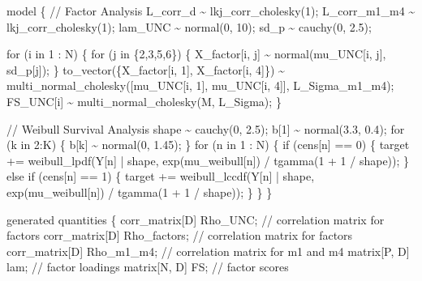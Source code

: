 \documentclass[
  letterpaper,
  DIV=11,
  numbers=noendperiod]{scrreprt}
\newenvironment{Shaded}{\begin{snugshade}}{\end{snugshade}}
\newcommand{\CommentTok}[1]{\textcolor[rgb]{0.37,0.37,0.37}{#1}}
\newcommand{\ControlFlowTok}[1]{\textcolor[rgb]{0.00,0.23,0.31}{#1}}
\newcommand{\DataTypeTok}[1]{\textcolor[rgb]{0.68,0.00,0.00}{#1}}
\newcommand{\DecValTok}[1]{\textcolor[rgb]{0.68,0.00,0.00}{#1}}
\newcommand{\FloatTok}[1]{\textcolor[rgb]{0.68,0.00,0.00}{#1}}
\newcommand{\KeywordTok}[1]{\textcolor[rgb]{0.00,0.23,0.31}{#1}}
\newcommand{\NormalTok}[1]{\textcolor[rgb]{0.00,0.23,0.31}{#1}}
\begin{document}
\begin{Shaded}
\begin{Highlighting}[]
\KeywordTok{model}\NormalTok{ \{}
  \CommentTok{// Factor Analysis}
\NormalTok{  L\_corr\_d \textasciitilde{} lkj\_corr\_cholesky(}\DecValTok{1}\NormalTok{);}
\NormalTok{  L\_corr\_m1\_m4 \textasciitilde{} lkj\_corr\_cholesky(}\DecValTok{1}\NormalTok{);}
\NormalTok{  lam\_UNC \textasciitilde{} normal(}\DecValTok{0}\NormalTok{, }\DecValTok{10}\NormalTok{);}
\NormalTok{  sd\_p \textasciitilde{} cauchy(}\DecValTok{0}\NormalTok{, }\FloatTok{2.5}\NormalTok{);}
  
  \ControlFlowTok{for}\NormalTok{ (i }\ControlFlowTok{in} \DecValTok{1}\NormalTok{ : N) \{}
    \ControlFlowTok{for}\NormalTok{ (j }\ControlFlowTok{in}\NormalTok{ \{}\DecValTok{2}\NormalTok{,}\DecValTok{3}\NormalTok{,}\DecValTok{5}\NormalTok{,}\DecValTok{6}\NormalTok{\}) \{}
\NormalTok{      X\_factor[i, j] \textasciitilde{} normal(mu\_UNC[i, j], sd\_p[j]);}
\NormalTok{    \}}
\NormalTok{    to\_vector(\{X\_factor[i, }\DecValTok{1}\NormalTok{], X\_factor[i, }\DecValTok{4}\NormalTok{]\}) \textasciitilde{} multi\_normal\_cholesky([mu\_UNC[i, }\DecValTok{1}\NormalTok{], mu\_UNC[i, }\DecValTok{4}\NormalTok{]]\textquotesingle{}, L\_Sigma\_m1\_m4);}
\NormalTok{    FS\_UNC[i] \textasciitilde{} multi\_normal\_cholesky(M, L\_Sigma);}
\NormalTok{  \}}

  \CommentTok{// Weibull Survival Analysis}
\NormalTok{  shape \textasciitilde{} cauchy(}\DecValTok{0}\NormalTok{, }\FloatTok{2.5}\NormalTok{);}
\NormalTok{  b[}\DecValTok{1}\NormalTok{] \textasciitilde{} normal(}\FloatTok{3.3}\NormalTok{, }\FloatTok{0.4}\NormalTok{);}
  \ControlFlowTok{for}\NormalTok{ (k }\ControlFlowTok{in} \DecValTok{2}\NormalTok{:K) \{}
\NormalTok{    b[k] \textasciitilde{} normal(}\DecValTok{0}\NormalTok{, }\FloatTok{1.45}\NormalTok{);}
\NormalTok{  \}}
  \ControlFlowTok{for}\NormalTok{ (n }\ControlFlowTok{in} \DecValTok{1}\NormalTok{ : N) \{}
    \ControlFlowTok{if}\NormalTok{ (cens[n] == }\DecValTok{0}\NormalTok{) \{}
      \KeywordTok{target +=}\NormalTok{ weibull\_lpdf(Y[n] | shape, exp(mu\_weibull[n]) / tgamma(}\DecValTok{1}\NormalTok{ + }\DecValTok{1}\NormalTok{ / shape));}
\NormalTok{    \} }\ControlFlowTok{else} \ControlFlowTok{if}\NormalTok{ (cens[n] == }\DecValTok{1}\NormalTok{) \{}
      \KeywordTok{target +=}\NormalTok{ weibull\_lccdf(Y[n] | shape, exp(mu\_weibull[n]) / tgamma(}\DecValTok{1}\NormalTok{ + }\DecValTok{1}\NormalTok{ / shape));}
\NormalTok{    \} }
\NormalTok{  \}}
\NormalTok{\}}

\KeywordTok{generated quantities}\NormalTok{ \{}
  \DataTypeTok{corr\_matrix}\NormalTok{[D] Rho\_UNC; }\CommentTok{// correlation matrix for factors}
  \DataTypeTok{corr\_matrix}\NormalTok{[D] Rho\_factors; }\CommentTok{// correlation matrix for factors}
  \DataTypeTok{corr\_matrix}\NormalTok{[D] Rho\_m1\_m4; }\CommentTok{// correlation matrix for m1 and m4}
  \DataTypeTok{matrix}\NormalTok{[P, D] lam; }\CommentTok{// factor loadings}
  \DataTypeTok{matrix}\NormalTok{[N, D] FS; }\CommentTok{// factor scores}
  

\end{Highlighting}
\end{Shaded}
\end{document}
